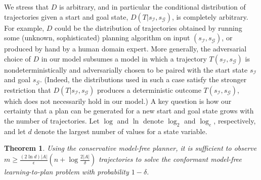 \documentclass{article}
\newtheorem{theorem}{Theorem}
\newcommand{\MEMO}[1]
{ \fbox{
		\begin{minipage}[b]{7.9 cm}
			#1
		\end{minipage}
} }
\begin{document}
	We stress that $D$ is arbitrary, and in particular the conditional distribution
	of trajectories given a start and goal state, $D(T|s_{\mathcal{I}},s_{\mathcal{G}})$, is completely 
	arbitrary. For example, $D$ could be the distribution of trajectories obtained
	by running some (unknown, sophisticated) planning algorithm on input $(s_{\mathcal{I}},s_{\mathcal{G}})$, or produced by hand by a human domain expert. 
	More generally, the adversarial choice of $D$ in our model subsumes a model in which a trajectory $T(s_{\mathcal{I}},s_{\mathcal{G}})$ is nondeterministically and adversarially chosen to
	be paired with the start state $s_{\mathcal{I}}$ and goal $s_{\mathcal{G}}$. 
	(Indeed, the distributions used in such a case satisfy the stronger restriction that $D(T|s_{\mathcal{I}},s_{\mathcal{G}})$ produces a deterministic outcome $T(s_{\mathcal{I}},s_{\mathcal{G}})$, which does not necessarily hold in our model.)
	A key question is how our certainty that a plan can be generated for a new start and goal state grows with the number of trajectories. Let $\log$ and $\ln$ denote $\log_2$ and $\log_e$, respectively, and let $d$ denote the largest number of values
	for a state variable. 
	\begin{theorem}
		Using the conservative model-free planner, 
		it is sufficient to observe 
		$m\geq\frac{(2\ln  d)|A|}{\epsilon}(n+\log\frac{2|A|}{\delta})$
		trajectories to solve the conformant model-free learning-to-plan problem with probability $1-\delta$. 
		\label{the:pac-conformant}
	\end{theorem}
\end{document}
